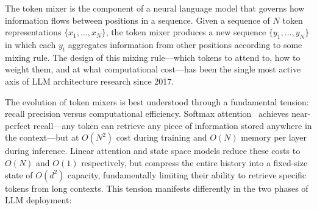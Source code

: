 %
%



The token mixer is the component of a neural language model that governs how information flows between positions in a sequence.
Given a sequence of $N$ token representations $\{x_1, \ldots, x_N\}$, the token mixer produces a new sequence $\{y_1, \ldots, y_N\}$ in which each $y_t$ aggregates information from other positions according to some mixing rule.
The design of this mixing rule---which tokens to attend to, how to weight them, and at what computational cost---has been the single most active axis of LLM architecture research since 2017.

The evolution of token mixers is best understood through a fundamental tension: recall precision versus computational efficiency.
Softmax attention~\cite{vaswani2017attention} achieves near-perfect recall---any token can retrieve any piece of information stored anywhere in the context---but at $O(N^2)$ cost during training and $O(N)$ memory per layer during inference.
Linear attention and state space models reduce these costs to $O(N)$ and $O(1)$ respectively, but compress the entire history into a fixed-size state of $O(d^2)$ capacity, fundamentally limiting their ability to retrieve specific tokens from long contexts.
This tension manifests differently in the two phases of LLM deployment:

